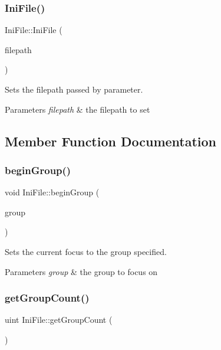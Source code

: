 \subsubsection{\texorpdfstring{IniFile()}{IniFile()}}
{\footnotesize\ttfamily Ini\+File\+::\+Ini\+File (\begin{DoxyParamCaption}\item[{const \mbox{\hyperlink{class_a_string}{A\+String}} \&}]{filepath }\end{DoxyParamCaption})\hspace{0.3cm}{\ttfamily [explicit]}}



Sets the filepath passed by parameter. 


\begin{DoxyParams}{Parameters}
{\em filepath} & the filepath to set \\
\hline
\end{DoxyParams}


\subsection{Member Function Documentation}
\mbox{\label{class_ini_file_a9a34c2bebd5c841500a925e0df6674e9}} 
\subsubsection{\texorpdfstring{beginGroup()}{beginGroup()}}
{\footnotesize\ttfamily void Ini\+File\+::begin\+Group (\begin{DoxyParamCaption}\item[{const \mbox{\hyperlink{class_a_string}{A\+String}} \&}]{group }\end{DoxyParamCaption})}



Sets the current focus to the group specified. 


\begin{DoxyParams}{Parameters}
{\em group} & the group to focus on \\
\hline
\end{DoxyParams}
\mbox{\label{class_ini_file_a0ce59b29c1e5a6ed6d8f52ed276524c1}} 
\subsubsection{\texorpdfstring{getGroupCount()}{getGroupCount()}}
{\footnotesize\ttfamily uint Ini\+File\+::get\+Group\+Count (\begin{DoxyParamCaption}{ }\end{DoxyParamCaption})}




